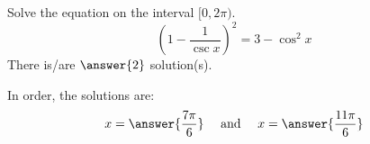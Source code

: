 \documentclass{ximera}
\author{Bobby Ramsey}
\begin{document}
\begin{exercise}
	Solve the equation on the interval $[0, 2\pi)$.
	\[ \left( 1 - \frac{1}{\csc x } \right)^2  = 3 - \cos^2 x\]
	There is/are $\answer{2}$ solution(s).
	\begin{exercise}
		In order, the solutions are:
		\[ x = \answer{\frac{7\pi}{6} } \quad \text{ and } \quad x = \answer{\frac{11\pi}{6}} \]
	\end{exercise}
\end{exercise}
\end{document}
